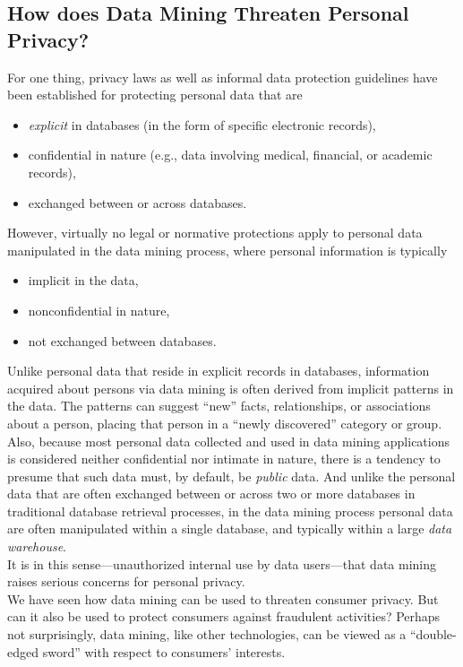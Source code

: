 \documentclass[12pt]{article}
\theoremstyle{definition}
\begin{document}
\subsection{How does Data Mining Threaten Personal Privacy?}
For one thing, privacy laws as well as informal data protection guidelines
have been established for protecting personal data that are
\begin{itemize}
\item \textit{explicit} in databases (in the form of specific electronic records),
\item confidential in nature (e.g., data involving medical, financial, or academic records),
\item exchanged between or across databases.
\end{itemize}
However, virtually no legal or normative protections apply to personal data manipulated
in the data mining process, where personal information is typically
\begin{itemize}
\item implicit in the data,
\item nonconfidential in nature,
\item not exchanged between databases.
\end{itemize}
Unlike personal data that reside in explicit records in databases, information
acquired about persons via data mining is often derived from implicit patterns in the
data. The patterns can suggest “new” facts, relationships, or associations about a person,
placing that person in a “newly discovered” category or group. Also, because most
personal data collected and used in data mining applications is considered neither
confidential nor intimate in nature, there is a tendency to presume that such data
must, by default, be \textit{public} data. And unlike the personal data that are often exchanged
between or across two or more databases in traditional database retrieval processes, in
the data mining process personal data are often manipulated within a single database,
and typically within a large \textit{data warehouse}.\\
It is in this sense—unauthorized internal use by data users—that data
mining raises serious concerns for personal privacy.\\
We have seen how data mining can be used to threaten consumer privacy. But can it
also be used to protect consumers against fraudulent activities? Perhaps not surprisingly,
data mining, like other technologies, can be viewed as a “double-edged sword” with
respect to consumers’ interests.
\end{document}
